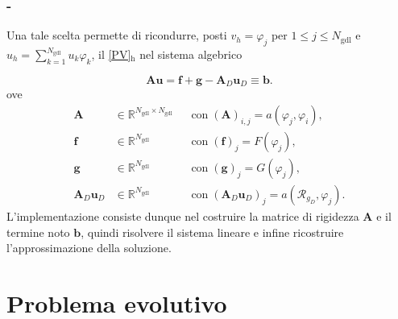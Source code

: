 \documentclass[11pt]{beamer}
\newcommand{\Ngdl}{N_{\text{gdl}}}
\newcommand{\SpaziaturaMate}[3]{
    \setlength{\thinmuskip}{#1mu}
    \setlength{\medmuskip}{#2mu}
    \setlength{\thickmuskip}{#3mu}
}
\newcommand{\teqref}[2]{\hyperref[#1]{#2}}
\begin{document}
            \begin{frame}\frametitle{\insertpart{} - \insertsection{}}
                {\SpaziaturaMate{1}{2}{3}
                Una tale scelta permette di ricondurre, posti $v_h=\varphi_j$ per $1\le j\le \Ngdl$ e $u_h=\sum_{k=1}^{\Ngdl}u_k\varphi_k$, il \teqref{eqPSVariazionaleDiscreto}{[PV]$_\text{h}$} nel sistema algebrico
                }
                \begin{equation*}
                    \mathbf A\mathbf u=\mathbf f+\mathbf g-\mathbf A_D\mathbf u_D\equiv\mathbf b.
                    \label{eqSistemaAlgebrico}
                \end{equation*}
                ove
                \begin{equation*}
                    \begin{aligned}
                        \mathbf A&\in\mathbb R^{\Ngdl\times\Ngdl}
                        &&\text{con}\;(\mathbf A)_{i,j}=a(\varphi_j,\varphi_i),\\
                        \mathbf f&\in\mathbb R^{\Ngdl}
                        &&\text{con}\;(\mathbf f)_j=F(\varphi_j),\\
                        \mathbf g&\in\mathbb R^{\Ngdl}
                        &&\text{con}\;(\mathbf g)_j=G(\varphi_j),\\
                        \mathbf A_D\mathbf u_D&\in\mathbb R^{\Ngdl}
                        &&\text{con}\;(\mathbf A_D\mathbf u_D)_j=a(\mathcal R_{g_D},\varphi_j).
                    \end{aligned}
                    \label{eqSistemaAlgebricoDefinizioneMatrici}
                \end{equation*}
                L'implementazione consiste dunque nel costruire la matrice di rigidezza $\mathbf A$ e il termine noto $\mathbf b$, quindi risolvere il sistema lineare e infine ricostruire l'approssimazione della soluzione.
            \end{frame}

        \section{Problema evolutivo}
        
\end{document}
